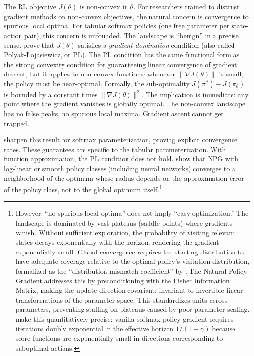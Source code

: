 The RL objective $J(\theta)$ is non-convex in $\theta$. For researchers trained to distrust gradient methods on non-convex objectives, the natural concern is convergence to spurious local optima. For tabular softmax policies (one free parameter per state-action pair), this concern is unfounded. The landscape is ``benign'' in a precise sense. \citet{agarwal2021theory} prove that $J(\theta)$ satisfies a \emph{gradient domination} condition (also called Polyak-\L{}ojasiewicz, or PL). The PL condition has the same functional form as the strong convexity condition for guaranteeing linear convergence of gradient descent, but it applies to non-convex functions: whenever $\|\nabla J(\theta)\|$ is small, the policy must be near-optimal. Formally, the sub-optimality $J(\pi^*) - J(\pi_\theta)$ is bounded by a constant times $\|\nabla J(\theta)\|^2$. The implication is immediate: any point where the gradient vanishes is globally optimal. The non-convex landscape has no false peaks, no spurious local maxima. Gradient ascent cannot get trapped.

\citet{mei2020} sharpen this result for softmax parameterization, proving explicit convergence rates. These guarantees are specific to the tabular parameterization. With function approximation, the PL condition does not hold. \citet[Theorem~6.2]{agarwal2021theory} show that NPG with log-linear or smooth policy classes (including neural networks) converges to a neighborhood of the optimum whose radius depends on the approximation error of the policy class, not to the global optimum itself.\footnote{However, ``no spurious local optima'' does not imply ``easy optimization.'' The landscape is dominated by vast plateaus (saddle points) where gradients vanish. Without sufficient exploration, the probability of visiting relevant states decays exponentially with the horizon, rendering the gradient exponentially small. Global convergence requires the starting distribution to have adequate coverage relative to the optimal policy's visitation distribution, formalized as the ``distribution mismatch coefficient'' by \citet{agarwal2021theory}. The Natural Policy Gradient addresses this by preconditioning with the Fisher Information Matrix, making the update direction covariant: invariant to invertible linear transformations of the parameter space. This standardizes units across parameters, preventing stalling on plateaus caused by poor parameter scaling. \citet{li2022softmax} make this quantitatively precise: vanilla softmax policy gradient requires iterations doubly exponential in the effective horizon $1/(1-\gamma)$ because score functions are exponentially small in directions corresponding to suboptimal actions.}

